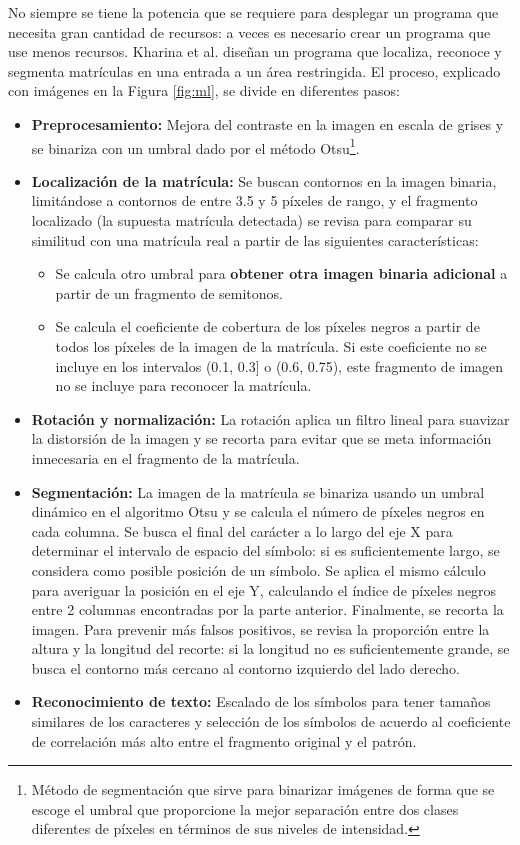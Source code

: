 \documentclass[12pt,a4paper,onecolumn,oneside]{report}
\begin{document}
No siempre se tiene la potencia que se requiere para desplegar un programa que necesita gran cantidad de recursos: a veces es necesario crear un programa que use menos recursos. Kharina et al. \cite{9790745} diseñan un programa que localiza, reconoce y segmenta matrículas en una entrada a un área restringida. El proceso, explicado con imágenes en la Figura \ref{fig:ml}, se divide en diferentes pasos:
\begin{itemize}
    \item \textbf{Preprocesamiento:} Mejora del contraste en la imagen en escala de grises y se binariza con un umbral dado por el método Otsu\footnote{Método de segmentación que sirve para binarizar imágenes de forma que se escoge el umbral que proporcione la mejor separación entre dos clases diferentes de píxeles en términos de sus niveles de intensidad.}.
    \item \textbf{Localización de la matrícula:} Se buscan contornos en la imagen binaria, limitándose a contornos de entre 3.5 y 5 píxeles de rango, y el fragmento localizado (la supuesta matrícula detectada) se revisa para comparar su similitud con una matrícula real a partir de las siguientes características:
    \begin{itemize}
        \item Se calcula otro umbral para \textbf{obtener otra imagen binaria adicional} a partir de un fragmento de semitonos.
        \item Se calcula el coeficiente de cobertura de los píxeles negros a partir de todos los píxeles de la imagen de la matrícula. Si este coeficiente no se incluye en los intervalos (0.1, 0.3] o (0.6, 0.75), este fragmento de imagen no se incluye para reconocer la matrícula.
    \end{itemize}
    \item \textbf{Rotación y normalización:} La rotación aplica un filtro lineal para suavizar la distorsión de la imagen y se recorta para evitar que se meta información innecesaria en el fragmento de la matrícula.
    \item \textbf{Segmentación:} La imagen de la matrícula se binariza usando un umbral dinámico en el algoritmo Otsu y se calcula el número de píxeles negros en cada columna. Se busca el final del carácter a lo largo del eje X para determinar el intervalo de espacio del símbolo: si es suficientemente largo, se considera como posible posición de un símbolo. Se aplica el mismo cálculo para averiguar la posición en el eje Y, calculando el índice de píxeles negros entre 2 columnas encontradas por la parte anterior. Finalmente, se recorta la imagen.
    Para prevenir más falsos positivos, se revisa la proporción entre la altura y la longitud del recorte: si la longitud no es suficientemente grande, se busca el contorno más cercano al contorno izquierdo del lado derecho. 
    \item \textbf{Reconocimiento de texto:} Escalado de los símbolos para tener tamaños similares de los caracteres y selección de los símbolos de acuerdo al coeficiente de correlación más alto entre el fragmento original y el patrón.
\end{itemize}
\end{document}
